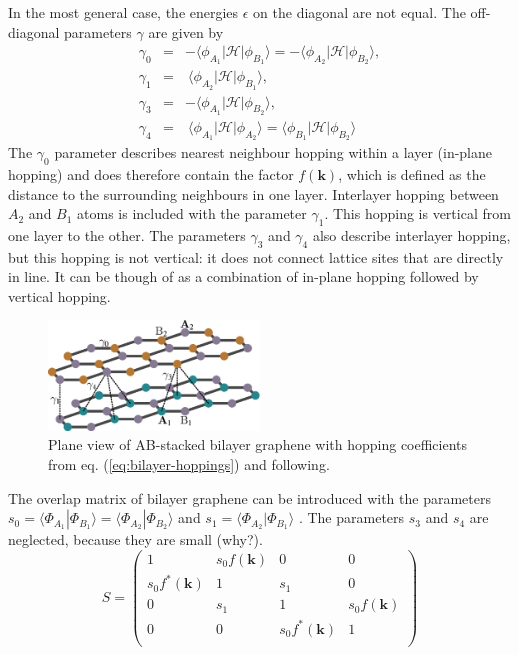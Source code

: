 In the most general case, the energies $\epsilon$ on the diagonal are not equal. The off-diagonal parameters $\gamma$ are given by
\begin{eqnarray}
\gamma_0 &=& - \langle \phi_{A_1} | \mathcal{H} | \phi_{B_1} \rangle = - \langle \phi_{A_2} | \mathcal{H} | \phi_{B_2} \rangle, \label{eq:bilayer-hoppings}\\
\gamma_1 &=& ~\langle \phi_{A_2} | \mathcal{H} | \phi_{B_1} \rangle, \\
\gamma_3 &=& - \langle \phi_{A_1} | \mathcal{H} | \phi_{B_2} \rangle, \\
\gamma_4 &=& ~\langle \phi_{A_1} | \mathcal{H} | \phi_{A_2} \rangle = \langle \phi_{B_1} | \mathcal{H} | \phi_{B_2} \rangle
\end{eqnarray}
The $\gamma_0$ parameter describes nearest neighbour hopping within a layer (in-plane hopping) and does therefore contain the factor $f\left( \mathbf{k} \right)$, which is defined as the distance to the surrounding neighbours in one layer. %
Interlayer hopping between $A_2$ and $B_1$ atoms is included with the parameter $\gamma_1$. This hopping is vertical from one layer to the other. The parameters $\gamma_3$ and $\gamma_4$ also describe interlayer hopping, but this hopping is not vertical: it does not connect lattice sites that are directly in line. It can be though of as a combination of in-plane hopping followed by vertical hopping.
\begin{figure}
\centering
\includegraphics[width=0.5\textwidth]{figure/numericalframework/graphene_lattice_bi_layer_planes_csch}
\caption{Plane view of AB-stacked bilayer graphene with hopping coefficients from eq. (\ref{eq:bilayer-hoppings}) and following.} \label{fig:bilayer-hoppings}
\end{figure}
The overlap matrix of bilayer graphene can be introduced with the parameters $s_0 = \langle \Phi_{A_1} | \Phi_{B_1} \rangle = \langle \Phi_{A_2} | \Phi_{B_2} \rangle $ and $s_1 = \langle \Phi_{A_2}  | \Phi_{B_1} \rangle $ \cite{Mucha-Kruczynski2010}. The parameters $s_3$ and $s_4$ are neglected, because they are small (why?).
\begin{equation}
S = \begin{pmatrix}
1 & s_0 f\left( \mathbf{k} \right)& 0 & 0 \\
s_0 f^*\left( \mathbf{k} \right) & 1 & s_1 & 0 \\
0 & s_1 & 1 & s_0 f\left( \mathbf{k} \right) \\
0 & 0 & s_0 f^* \left( \mathbf{k} \right) & 1\\
\end{pmatrix}
\end{equation}
